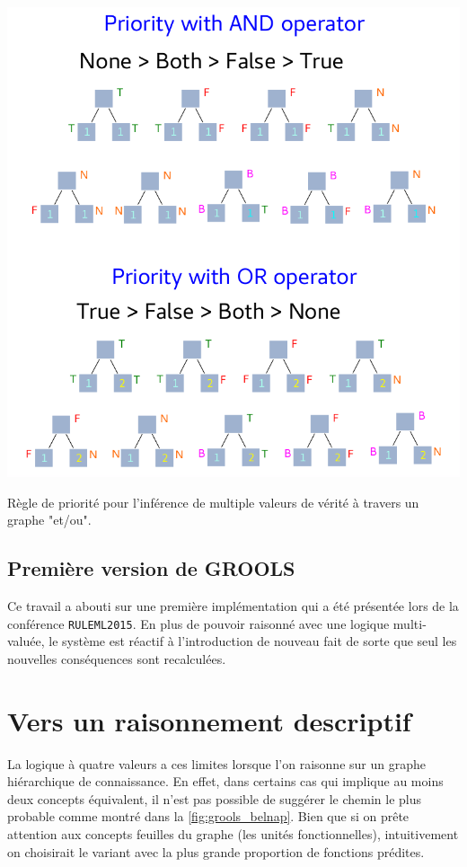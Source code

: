 \begin{refsegment}
\begin{shadedfigure}[H]
    \centering
    \includegraphics[width=\textwidth]{img/four_values_priorities_rules.pdf}
    \caption{ Règle de priorité pour l'inférence de multiple valeurs de vérité à travers un graphe "et/ou". }
    \label{fig:four_truth_values}
\end{shadedfigure}


\subsection{Première version de GROOLS}
Ce travail a abouti sur une première implémentation qui a été présentée lors de la conférence \texttt{RULEML2015}. En plus de pouvoir raisonné avec une logique multi-valuée, le système est réactif à l'introduction de nouveau fait de sorte que seul les nouvelles conséquences sont recalculées.



\section{Vers un raisonnement descriptif}

La logique à quatre valeurs a ces limites lorsque l'on raisonne sur un graphe hiérarchique de connaissance. En effet, dans certains cas qui implique au moins deux concepts équivalent, il n'est pas possible de suggérer le chemin le plus probable comme montré dans la \cref{fig:grools_belnap}. Bien que si on prête attention aux concepts feuilles du graphe (les unités fonctionnelles), intuitivement on choisirait le variant avec la plus grande proportion de fonctions prédites.


\end{refsegment}
